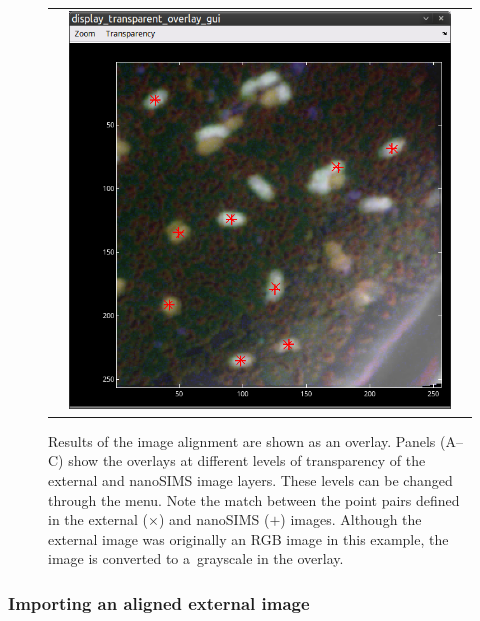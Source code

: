 \begin{figure}[!ht]
\begin{tabular}{ccc}
&
\includegraphics[scale=0.23]{figs7/LANS-ext-result3}
\end{tabular}
\caption{\label{fig:LANS-ext-result}%
Results of the image alignment are shown as an overlay. Panels (A--C) show the overlays at different levels of transparency of the external and nanoSIMS image layers. These levels can be changed through the  menu. Note the match between the point pairs defined in the external ($\times$) and nanoSIMS ($+$) images. Although the external image was originally an RGB image in this example, the image is converted to a~grayscale in the overlay.}
\end{figure}




\subsubsection{Importing an aligned external image}
\setcounter{step}{0}


